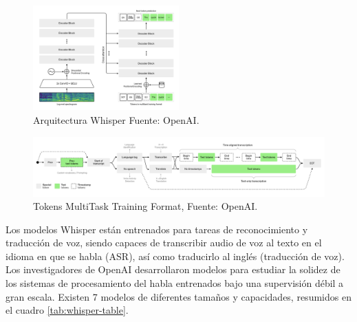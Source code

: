 \documentclass[conference]{IEEEtran}
\begin{document}
\begin{figure}[H]
\centering
\includegraphics[width=0.5\textwidth]{images/whisper_1.png}
\caption{Arquitectura Whisper Fuente: OpenAI.} 
\end{figure}

\begin{figure}[ht]
\centering
\includegraphics[width=1\textwidth]{images/whisper_2.png}
\caption{Tokens MultiTask Training Format, Fuente: OpenAI.}
\end{figure}

Los modelos Whisper están entrenados para tareas de reconocimiento y traducción de voz, siendo capaces de transcribir audio de voz al texto en el idioma en que se habla (ASR), así como traducirlo al inglés (traducción de voz). Los investigadores de OpenAI desarrollaron modelos para estudiar la solidez de los sistemas de procesamiento del habla entrenados bajo una supervisión débil a gran escala. Existen 7 modelos de diferentes tamaños y capacidades, resumidos en el cuadro \ref{tab:whisper-table}.
\end{document}
